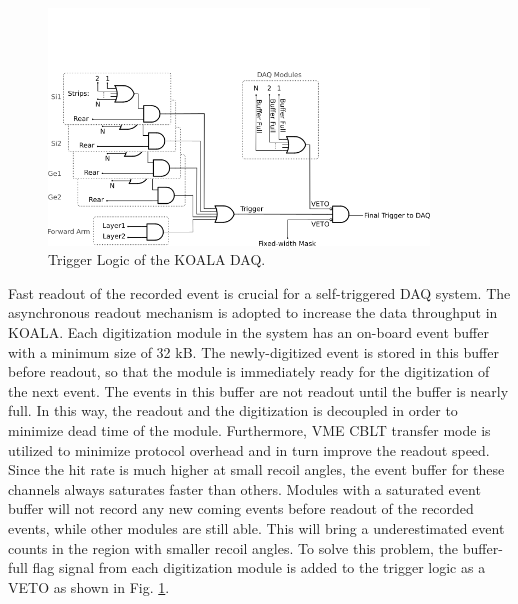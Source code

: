 \documentclass[number]{elsarticle}
\begin{document}
\begin{figure}[htbp]
\centering
\includegraphics[width=0.9\textwidth]{./trigger_logic.png}
\caption{Trigger Logic of the KOALA DAQ.}
\label{fig:trigger_logic}
\end{figure}

Fast readout of the recorded event is crucial for a self-triggered DAQ system.
The asynchronous readout mechanism is adopted to increase the data throughput in KOALA.
Each digitization module in the system has an on-board event buffer with a minimum size of 32 kB.
The newly-digitized event is stored in this buffer before readout, so that the
module is immediately ready for the digitization of the next event.
The events in this buffer are not readout until the buffer is nearly full. In
this way, the readout and the digitization is decoupled in order to minimize dead time of the module.
Furthermore, VME CBLT transfer mode is utilized to minimize protocol overhead and in turn improve the readout speed.
Since the hit rate is much higher at small recoil angles, the event buffer for these channels always saturates faster than others.
Modules with a saturated event buffer will not record any new coming events before readout of the recorded events, while other modules are still able.
This will bring a underestimated event counts in the region with smaller recoil angles.
To solve this problem, the buffer-full flag signal from each digitization
module is added to the trigger logic as a VETO as shown in Fig. \ref{fig:trigger_logic}.
\end{document}
